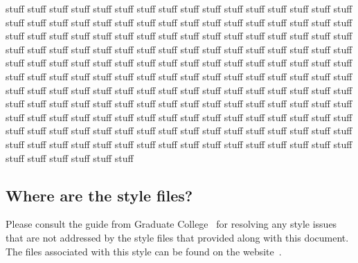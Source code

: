 \documentclass{bsu-ms}
\begin{document}
stuff stuff stuff stuff stuff stuff stuff stuff stuff stuff stuff stuff stuff
stuff stuff stuff stuff stuff stuff stuff stuff stuff stuff stuff stuff stuff
stuff stuff stuff stuff stuff stuff stuff stuff stuff stuff stuff stuff stuff
stuff stuff stuff stuff stuff stuff stuff stuff stuff stuff stuff stuff stuff
stuff stuff stuff stuff stuff stuff stuff stuff stuff stuff stuff stuff stuff
stuff stuff stuff stuff stuff stuff stuff stuff stuff stuff stuff stuff stuff
stuff stuff stuff stuff stuff stuff stuff stuff stuff stuff stuff stuff stuff
stuff stuff stuff stuff stuff stuff stuff stuff stuff stuff stuff stuff stuff
stuff stuff stuff stuff stuff stuff stuff stuff stuff stuff stuff stuff stuff
stuff stuff stuff stuff stuff stuff stuff stuff stuff stuff stuff stuff stuff
stuff stuff stuff stuff stuff stuff stuff stuff stuff stuff stuff stuff stuff
stuff stuff stuff stuff stuff stuff stuff stuff stuff stuff stuff stuff stuff
stuff stuff stuff stuff stuff stuff stuff stuff stuff stuff stuff stuff stuff
stuff stuff stuff stuff stuff stuff stuff stuff stuff stuff stuff stuff stuff



\subsection{Where are the style files?}



Please consult the guide from Graduate College~\cite{guide} for resolving any
style issues that are not addressed by the style files that provided along
with this document. The files associated with this style can be found on the
website~\cite{amit}.

\end{document}
